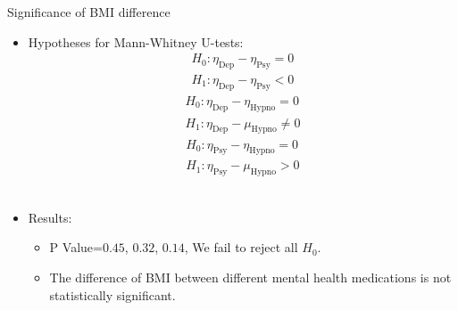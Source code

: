 \documentclass[
	11pt, %
]{beamer}
\begin{document}
\begin{frame}{Significance of BMI difference}
    \begin{itemize}

   \item Hypotheses for Mann-Whitney U-tests:
  \begin{equation} 
    \begin{split}
        \label{mann_whitney_deppsy}
            H_0 :	\eta_{\text{Dep}} -\eta_{\text{Psy}} = 0 \\
            H_1 :	\eta_{\text{Dep}} - \eta_{\text{Psy}} < 0
    \end{split}
\end{equation}
\begin{equation}
    \begin{split}
     \label{mann_whitney_dephypno}
       H_0 :	\eta_{\text{Dep}}-\eta_{\text{Hypno}} = 0 \\
       H_1 :	\eta_{\text{Dep}}-\mu_{\text{Hypno}} \neq 0
    \end{split}
\end{equation}
\begin{equation} 
\begin{split}
\label{mann_whitney_psyhypno}
        H_0 :	\eta_{\text{Psy}}-\eta_{\text{Hypno}} = 0 \\
        H_1 :	\eta_{\text{Psy}}-\mu_{\text{Hypno}} > 0
        \end{split}
 \end{equation} \\
                \item Results:
                \begin{itemize}
       \item P Value=$0.45$, $0.32$, $0.14$, We fail to reject all $H_0$. \\
       \item The difference of BMI between different mental health medications is not statistically significant.
   \end{itemize}
			
		\end{itemize}
\end{frame}






\end{document}
